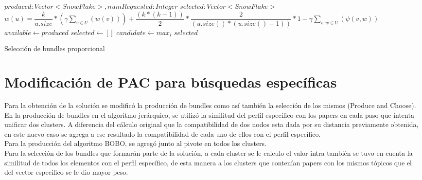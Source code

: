 \begin{algorithm}[H]
\begin{algorithmic}[1]
\REQUIRE $produced:Vector<SnowFlake>, numRequested:Integer$
\ENSURE $selected:Vector<SnowFlake>$
\STATE $w(u) = \dfrac{k}{u.size} * (\gamma \sum_{v \in U}(w(v))) + \dfrac{(k * (k-1))}{2} * \dfrac{2}{(u.size() * (u.size() - 1))} * 1 - \gamma \sum_{v,w \in U}(\psi(v,w))$
\STATE $available \leftarrow produced$
\STATE $selected \leftarrow []$
\STATE $candidate \leftarrow max_{i}$
\ENDWHILE
\RETURN $selected$
\end{algorithmic}
\caption{Selección de bundles proporcional}\label{alg:algSelProp}
\end{algorithm}

\section{Modificación de PAC para búsquedas específicas}
Para la obtención de la solución se modificó la producción de bundles como así también la 
selección de los mismos (Produce and Choose). \\
En la producción de bundles en el algoritmo jerárquico, se utilizó la similitud del perfil 
específico con los papers en cada paso que intenta unificar dos clusters. A diferencia del cálculo 
original que la compatibilidad de dos nodos esta dada por su distancia previamente obtenida, en 
este nuevo caso se agrega a ese resultado la compatibilidad de cada uno de ellos con el perfil 
específico. \\
Para la producción del algoritmo BOBO, se agregó junto al pivote en todos los clusters. \\
Para la selección de los bundles que formarán parte de la solución, a cada cluster se le 
calculo el valor intra también se tuvo en cuenta la similitud de todos los elementos con el perfil  
específico, de esta manera a los clusters que contenían papers con los mismos tópicos que el del 
vector especifico se le dio mayor peso.

